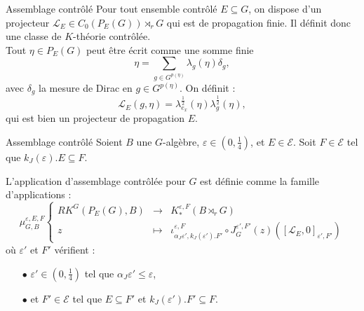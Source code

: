 
\begin{frame}{Assemblage contrôlé}
Pour tout ensemble contrôlé $E\subseteq G$, on dispose d'un projecteur $\mathcal L_E\in C_0(P_E(G))\rtimes_r G$ qui est de propagation finie. Il définit donc une classe de $K$-théorie contrôlée.\\
\vspace{0.3 cm}
Tout $\eta\in P_E(G)$ peut être écrit comme une somme finie 
\[\eta = \sum_{g\in G^{p(\eta)}}\lambda_g(\eta)\delta_g,\]
avec $\delta_g$ la mesure de Dirac en $g\in G^{p(\eta)}$. On définit :
\[\mathcal L_E(g,\eta) = \lambda_{e_x}^{\frac{1}{2}}(\eta)\lambda_g^{\frac{1}{2}}(\eta),\] 
qui est bien un projecteur  de propagation $E$.
\end{frame}

\begin{frame}{Assemblage contrôlé}
Soient $B$ une $G$-algèbre, $\varepsilon\in (0,\frac{1}{4})$, et $E\in\mathcal E$. Soit $F\in \mathcal E$ tel que $k_J(\varepsilon).E \subseteq F$. 
\begin{definitionfr}
L'application d'assemblage contrôlée pour $G$ est définie comme la famille d'applications :
\[\mu_{G,B}^{\varepsilon,E,F}\left\{
\begin{array}{rcl}
RK^G(P_E(G), B) & \rightarrow & K_*^{\varepsilon, F}(B\rtimes_r G)\\
z & \mapsto & \iota_{\alpha_J\varepsilon', k_J(\varepsilon').F'}^{\varepsilon,F} \circ J_G^{\varepsilon', F'}(z)([\mathcal L_E,0]_{\varepsilon' , F'})
\end{array}\right.\]
où $\varepsilon'$ et $F'$ vérifient :
\begin{itemize}
\item[$\bullet$] $\varepsilon'\in (0,\frac{1}{4})$ tel que $\alpha_J \varepsilon'\leq \varepsilon$,
\item[$\bullet$] et $F'\in\mathcal E$ tel que $E\subseteq F'$ et $k_J(\varepsilon').F'\subseteq F$.
\end{itemize}
\end{definitionfr}
\end{frame}

